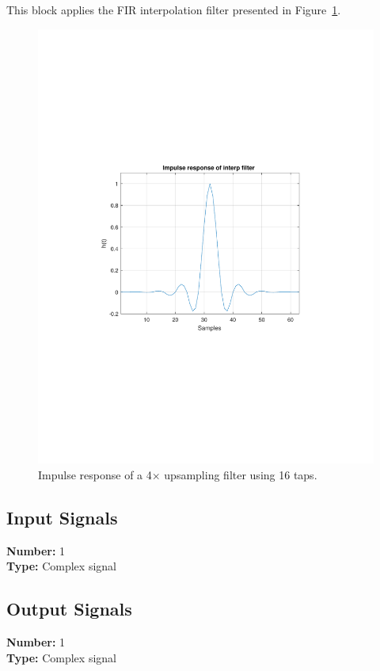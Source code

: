 This block applies the FIR interpolation filter presented in Figure~\ref{fig:FILTER}.

\begin{figure}[h]
\centering
\includegraphics[trim={7cm 8cm 7cm 8cm},width=.3\linewidth]{./lib/upsampler/figures/FILTER}
\caption{Impulse response of a 4$\times$ upsampling filter using 16 taps.}
\label{fig:FILTER}
\end{figure}	

\subsection*{Input Signals}

\textbf{Number:} 1\\
\textbf{Type:} Complex signal

\subsection*{Output Signals}

\textbf{Number:} 1\\
\textbf{Type:} Complex signal


